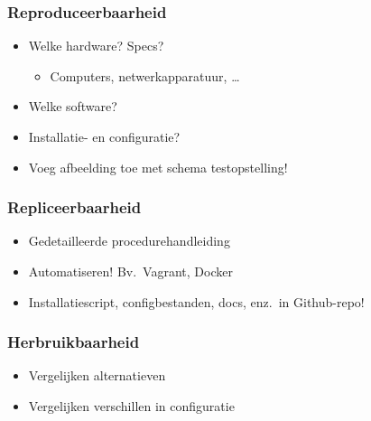 \documentclass[aspectratio=169]{beamer}
\begin{document}
\begin{frame}
  \frametitle{Reproduceerbaarheid}


  \bigskip

  \begin{itemize}
    \item Welke hardware? Specs?
      \begin{itemize}
        \item Computers, netwerkapparatuur, \ldots
      \end{itemize}
    \item Welke software?
    \item Installatie- en configuratie?
    \item Voeg afbeelding toe met schema testopstelling!
  \end{itemize}

\end{frame}

\begin{frame}
  \frametitle{Repliceerbaarheid}


  \bigskip

  \begin{itemize}
    \item Gedetailleerde procedurehandleiding
    \item Automatiseren! Bv.\ Vagrant, Docker
    \item Installatiescript, configbestanden, docs, enz.\ in Github-repo!
  \end{itemize}

\end{frame}

\begin{frame}
  \frametitle{Herbruikbaarheid}


  \bigskip

  \begin{itemize}
    \item Vergelijken alternatieven
    \item Vergelijken verschillen in configuratie
  \end{itemize}

\end{frame}
\end{document}
